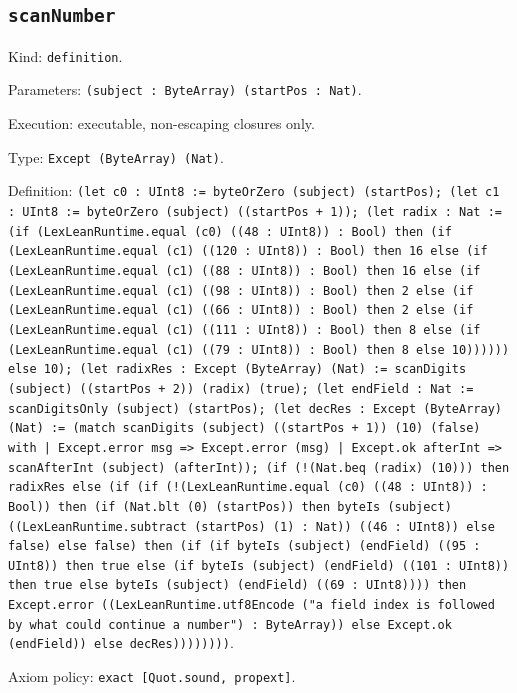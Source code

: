 \documentclass[11pt]{article}
\begin{document}
\subsection*{\texttt{scanNumber}}
\noindent Kind: \texttt{definition}.\par
\noindent Parameters: \texttt{(subject : ByteArray) (startPos : Nat)}.\par
\noindent Execution: executable, non-escaping closures only.\par
\noindent Type: \texttt{Except (ByteArray) (Nat)}.\par
\noindent Definition: \texttt{(let c0 : UInt8 := byteOrZero (subject) (startPos); (let c1 : UInt8 := byteOrZero (subject) ((startPos + 1)); (let radix : Nat := (if (LexLeanRuntime.equal (c0) ((48 : UInt8)) : Bool) then (if (LexLeanRuntime.equal (c1) ((120 : UInt8)) : Bool) then 16 else (if (LexLeanRuntime.equal (c1) ((88 : UInt8)) : Bool) then 16 else (if (LexLeanRuntime.equal (c1) ((98 : UInt8)) : Bool) then 2 else (if (LexLeanRuntime.equal (c1) ((66 : UInt8)) : Bool) then 2 else (if (LexLeanRuntime.equal (c1) ((111 : UInt8)) : Bool) then 8 else (if (LexLeanRuntime.equal (c1) ((79 : UInt8)) : Bool) then 8 else 10)))))) else 10); (let radixRes : Except (ByteArray) (Nat) := scanDigits (subject) ((startPos + 2)) (radix) (true); (let endField : Nat := scanDigitsOnly (subject) (startPos); (let decRes : Except (ByteArray) (Nat) := (match scanDigits (subject) ((startPos + 1)) (10) (false) with | Except.error msg => Except.error (msg) | Except.ok afterInt => scanAfterInt (subject) (afterInt)); (if (!(Nat.beq (radix) (10))) then radixRes else (if (if (!(LexLeanRuntime.equal (c0) ((48 : UInt8)) : Bool)) then (if (Nat.blt (0) (startPos)) then byteIs (subject) ((LexLeanRuntime.subtract (startPos) (1) : Nat)) ((46 : UInt8)) else false) else false) then (if (if byteIs (subject) (endField) ((95 : UInt8)) then true else (if byteIs (subject) (endField) ((101 : UInt8)) then true else byteIs (subject) (endField) ((69 : UInt8)))) then Except.error ((LexLeanRuntime.utf8Encode ("a field index is followed by what could continue a number") : ByteArray)) else Except.ok (endField)) else decRes))))))))}.\par
\noindent Axiom policy: \texttt{exact [Quot.sound, propext]}.\par
\end{document}

